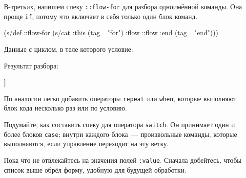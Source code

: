 В-третьих, напишем спеку \texttt{::flow-for} для разбора одноимённой
команды. Она проще \texttt{if}, потому что включает в себя только один блок
команд.

\begin{english}
  \begin{clojure}
(s/def ::flow-for
  (s/cat :this (tag= "for")
         :flow ::flow
         :end (tag= "end")))
  \end{clojure}
\end{english}

Данные с циклом, в теле которого условие:

\begin{english}
  \begin{clojure}
  \end{clojure}
\end{english}

Результат разбора:

\begin{english}
  \begin{clojure}
[[:for
  {:this {:command "for"}
   :flow
   [[:if
     {:this {:command "if" :condition "..."}
      :flow [[:cmd {:command "print" :text "hello"}]]
      :end {:command "end"}}]]
   :end {:command "end"}}]]
  \end{clojure}
\end{english}

По аналогии легко добавить операторы \texttt{repeat} или \verb|when|, которые
выполняют блок кода несколько раз или по условию.

Подумайте, как составить спеку для оператора \texttt{switch}. Он принимает один
и более блоков \verb|case|; внутри каждого блока~--- произвольные команды,
которые выполняются, если управление переходит на эту ветку.

\begin{english}
  \begin{clojure}
  \end{clojure}
\end{english}

Пока что не отвлекайтесь на значения полей \verb|:value|. Сначала добейтесь,
чтобы список выше обрёл форму, удобную для будущей обработки.

